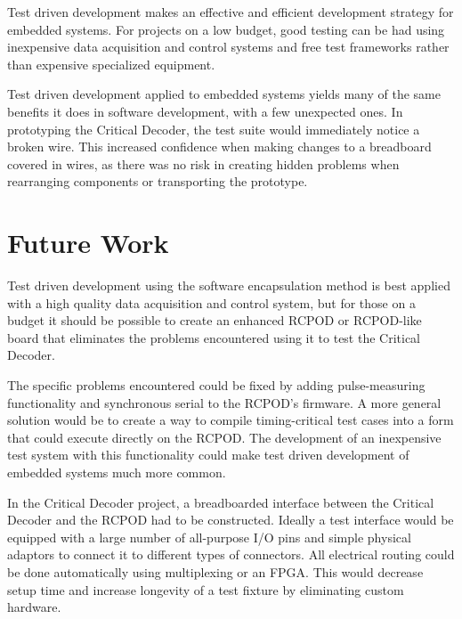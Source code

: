 \documentclass[letterpaper]{article}
\begin{document}
Test driven development makes an effective and efficient development strategy for embedded systems. For
projects on a low budget, good testing can be had using inexpensive data acquisition
and control systems and free test frameworks rather than expensive specialized equipment.

Test driven
development applied to embedded systems yields many of the same benefits it does in software development,
with a few unexpected ones. In prototyping the Critical Decoder, the test suite would immediately notice
a broken wire. This increased confidence when making changes to a breadboard covered in wires, as there
was no risk in creating hidden problems when rearranging components or transporting the prototype.

\section{Future Work}

Test driven development using the software encapsulation method is best applied with a high quality
data acquisition and control system, but for those on a budget it should be possible to create an enhanced
RCPOD or RCPOD-like board that eliminates the problems encountered using it to test the Critical Decoder.

The specific problems encountered could be fixed by adding pulse-measuring functionality and synchronous
serial to the RCPOD's firmware. A more general solution would be to create a way to compile timing-critical
test cases into a form that could execute directly on the RCPOD. The development of an inexpensive test
system with this functionality could make test driven development of embedded systems much more common.

In the Critical Decoder project, a breadboarded interface between the Critical Decoder and the RCPOD had
to be constructed. Ideally a test interface would be equipped with a large number of all-purpose I/O pins
and simple physical adaptors to connect it to different types of connectors. All electrical routing could
be done automatically using multiplexing or an FPGA. This would decrease setup time and increase longevity
of a test fixture by eliminating custom hardware.
\end{document}
